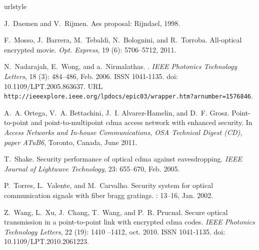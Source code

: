 \documentclass[aspectratio=169]{beamer}
\begin{document}
\begin{thebibliography}{7}


\providecommand{\natexlab}[1]{#1}
\providecommand{\url}[1]{\texttt{#1}}
\expandafter\ifx\csname urlstyle\endcsname\relax
  \providecommand{\doi}[1]{doi: #1}\else
  \providecommand{\doi}{doi: \begingroup \urlstyle{rm}\Url}\fi

 J.~Daemen and V.~Rijmen.
\newblock Aes proposal: Rijndael, 1998.

F.~Mosso, J.~Barrera, M.~Tebaldi, N.~Bolognini, and R.~Torroba.
\newblock All-optical encrypted movie.
\newblock \emph{Opt. Express}, 19 (6): 5706--5712, 2011.

N.~Nadarajah, E.~Wong, and a.~Nirmalathas.
.
\newblock \emph{IEEE Photonics Technology Letters}, 18 (3):
  484--486, Feb. 2006.
\newblock ISSN 1041-1135.
\newblock \doi{10.1109/LPT.2005.863637}.
\newblock URL
  \url{http://ieeexplore.ieee.org/lpdocs/epic03/wrapper.htm?arnumber=1576846}.

A.~A. Ortega, V.~A. Bettachini, J.~I. Alvarez-Hamelin, and D.~F. Grosz.
\newblock Point-to-point and point-to-multipoint cdma access network with
  enhanced security.
\newblock In \emph{Access Networks and In-house Communications, OSA Technical
  Digest (CD), paper ATuB6}, Toronto, Canada, June 2011.

T.~Shake.
\newblock Security performance of optical cdma against eavesdropping.
\newblock \emph{IEEE Journal of Lightwave Technology}, 23: 655--670,
  Feb. 2005.

P.~Torres, L.~Valente, and M.~Carvalho.
\newblock Security system for optical communication signals with fiber bragg
  gratings.
: 13--16, Jan. 2002.

Z.~Wang, L.~Xu, J.~Chang, T.~Wang, and P.~R. Prucnal.
\newblock Secure optical transmission in a point-to-point link with encrypted
  cdma codes.
\newblock \emph{IEEE Photonics Technology Letters}, 22 (19):
  1410 --1412, oct. 2010.
\newblock ISSN 1041-1135.
\newblock \doi{10.1109/LPT.2010.2061223}.

\end{thebibliography}
\end{document}
